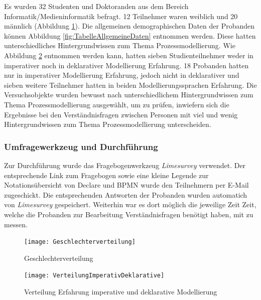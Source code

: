 Es wurden 32 Studenten und Doktoranden aus dem Bereich Informatik/Medieninformatik befragt. 12 Teilnehmer waren weiblich und 20 männlich (Abbildung \ref{fig:Geschlechterverteilung}). Die allgemeinen demographischen Daten der Probanden können Abbildung \ref{fig:TabelleAllgemeineDaten} entnommen werden. Diese hatten unterschiedliches Hintergrundwissen zum Thema Prozessmodellierung. Wie Abbildung \ref{fig:VerteilungImperativDeklarative} entnommen werden kann, hatten sieben Studienteilnehmer weder in imperativer noch in deklarativer Modellierung Erfahrung. 18 Probanden hatten nur in imperativer Modellierung Erfahrung, jedoch nicht in deklarativer und sieben weitere Teilnehmer hatten in beiden Modellierungssprachen Erfahrung. Die Versuchsobjekte wurden bewusst nach unterschiedlichem Hintergrundwissen zum Thema Prozessmodellierung ausgewählt, um zu prüfen, inwiefern sich die Ergebnisse bei den Verständnisfragen zwischen Personen mit viel und wenig Hintergrundwissen zum Thema Prozessmodellierung unterscheiden.\newline

\subsubsection{Umfragewerkzeug und Durchführung}

Zur Durchführung wurde das Fragebogenwerkzeug \textit{Limesurvey} verwendet. Der entsprechende Link zum Fragebogen sowie eine kleine Legende zur Notationsübersicht von Declare und BPMN wurde den Teilnehmern per E-Mail zugeschickt. Die entsprechenden Antworten der Probanden wurden automatich von \textit{Limesurvey} gespeichert. Weiterhin war es dort möglich die jeweilige Zeit Zeit, welche die Probanden zur Bearbeitung Verständnisfragen benötigt haben, mit zu messen.

\begin{figure}[htp]
\begin{center}
  \texttt{[image: Geschlechterverteilung]} %
  \caption{Geschlechterverteilung}
  \label{fig:Geschlechterverteilung}
\end{center}
\end{figure}

\begin{figure}[htp]
\begin{center}
  \texttt{[image: VerteilungImperativDeklarative]} %
  \caption{Verteilung Erfahrung imperative und deklarative Modellierung}
  \label{fig:VerteilungImperativDeklarative}
\end{center}
\end{figure}

